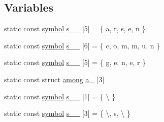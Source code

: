 \subsection*{Variables}
\begin{DoxyCompactItemize}
\item 
static const \mbox{\hyperlink{namespaceirk_1_1porter2_afd04c4eb58a1dabcf8f3ab2d7e9f9ed5}{symbol}} \mbox{\hyperlink{namespaceirk_1_1porter2_a734d88004fa3116732f77cda8188a158}{s\+\_\+\_}} \mbox{[}5\mbox{]} = \{ \textquotesingle{}a\textquotesingle{}, \textquotesingle{}r\textquotesingle{}, \textquotesingle{}s\textquotesingle{}, \textquotesingle{}e\textquotesingle{}, \textquotesingle{}n\textquotesingle{} \}
\item 
static const \mbox{\hyperlink{namespaceirk_1_1porter2_afd04c4eb58a1dabcf8f3ab2d7e9f9ed5}{symbol}} \mbox{\hyperlink{namespaceirk_1_1porter2_a500fbb6a1584ec25e84ced156ea683a4}{s\+\_\+\_}} \mbox{[}6\mbox{]} = \{ \textquotesingle{}c\textquotesingle{}, \textquotesingle{}o\textquotesingle{}, \textquotesingle{}m\textquotesingle{}, \textquotesingle{}m\textquotesingle{}, \textquotesingle{}u\textquotesingle{}, \textquotesingle{}n\textquotesingle{} \}
\item 
static const \mbox{\hyperlink{namespaceirk_1_1porter2_afd04c4eb58a1dabcf8f3ab2d7e9f9ed5}{symbol}} \mbox{\hyperlink{namespaceirk_1_1porter2_a9cdc597d2cc6f5daa6d20e9e9ac982ee}{s\+\_\+\_}} \mbox{[}5\mbox{]} = \{ \textquotesingle{}g\textquotesingle{}, \textquotesingle{}e\textquotesingle{}, \textquotesingle{}n\textquotesingle{}, \textquotesingle{}e\textquotesingle{}, \textquotesingle{}r\textquotesingle{} \}
\item 
static const struct \mbox{\hyperlink{structirk_1_1porter2_1_1among}{among}} \mbox{\hyperlink{namespaceirk_1_1porter2_aff642f7bbfc5bd013dbbdd8876527dbf}{a\+\_}} \mbox{[}3\mbox{]}
\item 
static const \mbox{\hyperlink{namespaceirk_1_1porter2_afd04c4eb58a1dabcf8f3ab2d7e9f9ed5}{symbol}} \mbox{\hyperlink{namespaceirk_1_1porter2_a6d3d58138b401aaac7a0e63b8a9e00f1}{s\+\_\+\_}} \mbox{[}1\mbox{]} = \{ \textquotesingle{}\textbackslash{}\textquotesingle{}\textquotesingle{} \}
\item 
static const \mbox{\hyperlink{namespaceirk_1_1porter2_afd04c4eb58a1dabcf8f3ab2d7e9f9ed5}{symbol}} \mbox{\hyperlink{namespaceirk_1_1porter2_a3553fc5f140a6a3ab8c0245111958e60}{s\+\_\+\_}} \mbox{[}3\mbox{]} = \{ \textquotesingle{}\textbackslash{}\textquotesingle{}\textquotesingle{}, \textquotesingle{}s\textquotesingle{}, \textquotesingle{}\textbackslash{}\textquotesingle{}\textquotesingle{} \}

\end{DoxyCompactItemize}
